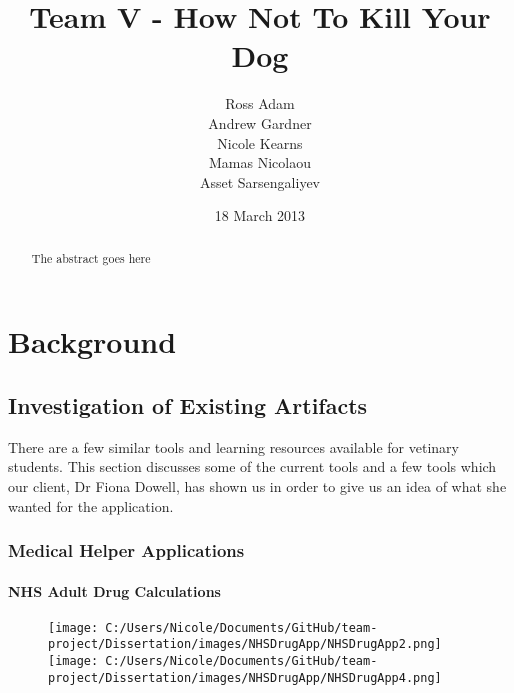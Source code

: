 \documentclass{l3proj}
\begin{document}
\title{Team V - How Not To Kill Your Dog}
\author{Ross Adam \\
        Andrew Gardner \\
        Nicole Kearns \\
        Mamas Nicolaou \\
        Asset Sarsengaliyev}
\date{18 March 2013}
\maketitle
\begin{abstract}

The abstract goes here

\end{abstract}
\educationalconsent
\tableofcontents

\chapter{Background}
\label{background}

\section{Investigation of Existing Artifacts}


There are a few similar tools and learning resources available for vetinary students. This section discusses some of the current tools and a few tools which our client, Dr Fiona Dowell, has shown us in order to give us an idea of what she wanted for the application.

\subsection{Medical Helper Applications}


\subsubsection{NHS Adult Drug Calculations}

\begin{figure}[!htb]
  \texttt{[image: C:/Users/Nicole/Documents/GitHub/team-project/Dissertation/images/NHSDrugApp/NHSDrugApp2.png]}
\endminipage\hfill
{}
  \texttt{[image: C:/Users/Nicole/Documents/GitHub/team-project/Dissertation/images/NHSDrugApp/NHSDrugApp4.png]}
\endminipage
\end{figure}
\end{document}
